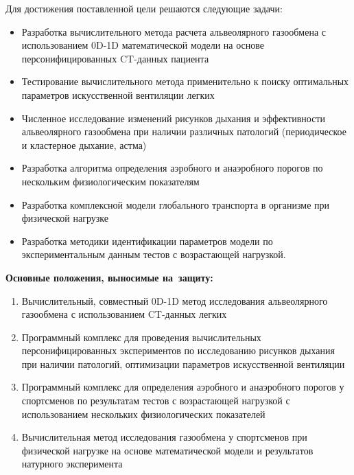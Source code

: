Для достижения поставленной цели решаются следующие задачи:

\begin{itemize}
\item
Разработка вычислительного метода расчета альвеолярного газообмена с использованием 0D-1D математической модели на основе персонифицированных CT-данных пациента  
\item
Тестирование вычислительного метода применительно к поиску оптимальных параметров искусственной вентиляции легких
\item
Численное исследование изменений рисунков дыхания и эффективности альвеолярного газообмена при наличии различных патологий (периодическое и кластерное дыхание, астма)
\item
Разработка алгоритма определения аэробного и анаэробного порогов по нескольким физиологическим показателям
\item
Разработка комплексной модели глобального транспорта в организме при физической нагрузке
\item
Разработка методики идентификации параметров модели по экспериментальным данным тестов с возрастающей нагрузкой.
\end{itemize}

\textbf{Основные положения, выносимые на~защиту:}
\begin{enumerate}
 \item
 Вычислительный, совместный 0D-1D метод исследования альвеолярного газообмена с использованием CT-данных легких 
 \item
 Программный комплекс для проведения вычислительных персонифицированных экспериментов по исследованию рисунков дыхания при наличии патологий, оптимизации параметров искусственной вентиляции 
 \item
 Программный комплекс для определения аэробного и анаэробного порогов у спортсменов по результатам тестов с возрастающей нагрузкой с использованием нескольких физиологических показателей
 \item
 Вычислительная метод исследования газообмена у спортсменов при физической нагрузке на основе математической модели и результатов натурного эксперимента
   
\end{enumerate}

